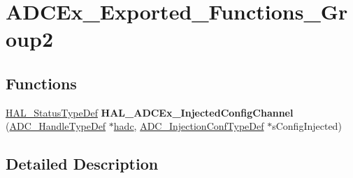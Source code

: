 \hypertarget{group___a_d_c_ex___exported___functions___group2}{\section{A\-D\-C\-Ex\-\_\-\-Exported\-\_\-\-Functions\-\_\-\-Group2}
\label{group___a_d_c_ex___exported___functions___group2}
}
\subsection*{Functions}
\begin{DoxyCompactItemize}
\item 
\hypertarget{group___a_d_c_ex___exported___functions___group2_ga5736a78398eb51ddeb09dd83d1243045}{\hyperlink{stm32l1xx__hal__def_8h_a63c0679d1cb8b8c684fbb0632743478f}{H\-A\-L\-\_\-\-Status\-Type\-Def} {\bfseries H\-A\-L\-\_\-\-A\-D\-C\-Ex\-\_\-\-Injected\-Config\-Channel} (\hyperlink{struct_a_d_c___handle_type_def}{A\-D\-C\-\_\-\-Handle\-Type\-Def} $\ast$\hyperlink{stm32l1xx__it_8c_a62fcafba91cf315db7e0e0c8f22c656f}{hadc}, \hyperlink{struct_a_d_c___injection_conf_type_def}{A\-D\-C\-\_\-\-Injection\-Conf\-Type\-Def} $\ast$s\-Config\-Injected)}\label{group___a_d_c_ex___exported___functions___group2_ga5736a78398eb51ddeb09dd83d1243045}

\end{DoxyCompactItemize}


\subsection{Detailed Description}
